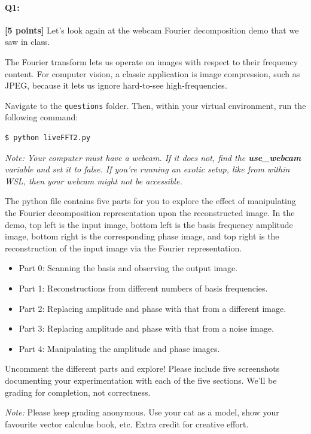 \documentclass[11pt]{article}
\begin{document}
\pagebreak


\paragraph{Q1:} \textbf{[5 points]} Let's look again at the webcam Fourier decomposition demo that we saw in class. 

The Fourier transform lets us operate on images with respect to their frequency content. For computer vision, a classic application is image compression, such as JPEG, because it lets us ignore hard-to-see high-frequencies.

\begin{tcolorbox}[colback=orange!5!white,colframe=orange!75!black]
Navigate to the \texttt{questions} folder. Then, within your virtual environment, run the following command:
\begin{verbatim}
$ python liveFFT2.py
\end{verbatim}

\emph{Note: Your computer must have a webcam. If it does not, find the \textbf{use\_webcam} variable and set it to false. If you're running an exotic setup, like from within WSL, then your webcam might not be accessible.}

The python file contains five parts for you to explore the effect of manipulating the Fourier decomposition representation upon the reconstructed image. In the demo, top left is the input image, bottom left is the basis frequency amplitude image, bottom right is the corresponding phase image, and top right is the reconstruction of the input image via the Fourier representation.

\begin{itemize}
    \item Part 0: Scanning the basis and observing the output image.
    \item Part 1: Reconstructions from different numbers of basis frequencies.
    \item Part 2: Replacing amplitude and phase with that from a different image.
    \item Part 3: Replacing amplitude and phase with that from a noise image.
    \item Part 4: Manipulating the amplitude and phase images.
\end{itemize}

Uncomment the different parts and explore! Please include five screenshots documenting your experimentation with each of the five sections. We'll be grading for completion, not correctness.

\emph{Note:} Please keep grading anonymous. Use your cat as a model, show your favourite vector calculus book, etc. Extra credit for creative effort.
\end{tcolorbox}
\end{document}
